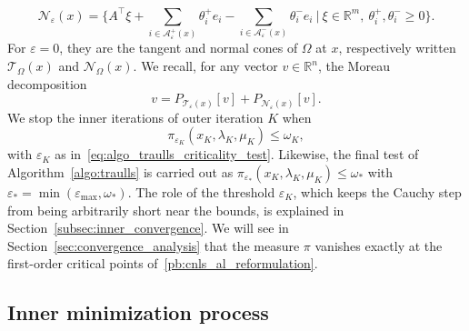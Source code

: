\documentclass{article}
\numberwithin{equation}{section}
\newcommand{\RR}{{\mathbb{R}}} %
\newcommand{\calA}{{\mathcal{A}}}
\newcommand{\calN}{{\mathcal{N}}}
\newcommand{\calT}{{\mathcal{T}}}
\newcommand{\proj}[2]{P_{#1} \left[ {#2} \right]} %
\theoremstyle{plain}
\begin{document}
\begin{equation}\label{eq:normal_cone_eps}
	\calN_\varepsilon(x) = \bigg\{ A^\top\xi + \sum_{i \in \calA^+_\varepsilon(x)} \theta^+_i e_i - \sum_{i \in \calA^-_\varepsilon(x)} \theta^-_i e_i \ \Big|\ \xi\in\RR^m,\ \theta^+_i, \theta^-_i\ge0\bigg\}.
\end{equation}
For $\varepsilon = 0$, they are the tangent and normal cones of $\Omega$ at $x$, respectively written $\calT_\Omega(x)$ and $\calN_\Omega(x)$. We recall, for any vector $v \in \RR^n$, the Moreau decomposition
\begin{equation}\label{eq:moreau_decomposition}
	v = \proj{\calT_\varepsilon(x)}{v} + \proj{\calN_\varepsilon(x)}{v}.
\end{equation}
We stop the inner iterations of outer iteration $K$ when
\begin{equation}\label{eq:criticality_cond_reduced_grad}
	\pi_{\varepsilon_K}(x_K,\lambda_K,\mu_K) \le \omega_K,
\end{equation}
with $\varepsilon_K$ as in~\eqref{eq:algo_traulls_criticality_test}. Likewise, the final test of Algorithm~\ref{algo:traulls} is carried out as $\pi_{\varepsilon_*}(x_K,\lambda_K,\mu_K) \le \omega_*$ with $\varepsilon_* = \min(\varepsilon_{\max},\omega_*)$.
The role of the threshold $\varepsilon_K$, which keeps the Cauchy step from being arbitrarily short near the bounds, is explained in Section~\ref{subsec:inner_convergence}. We will see in Section~\ref{sec:convergence_analysis} that the measure $\pi$ vanishes exactly at the first-order critical points of~\eqref{pb:cnls_al_reformulation}. 

	\subsection{Inner minimization process}\label{subsec:inner_iteration}
\end{document}
